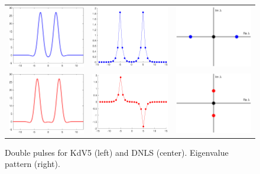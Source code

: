 \documentclass[12pt,reqno,oneside]{article}
\theoremstyle{definition}
\theoremstyle{remark}
\begin{document}
\begin{figure}
\centering
\begin{tabular}{ccc}
\includegraphics[width=4cm]{images/dp1.eps} &
\includegraphics[width=4cm]{images/dnls2unstable.eps} &
\includegraphics[width=4cm]{images/unstableeigpattern.eps} \\
\includegraphics[width=4cm]{images/dp2.eps} &
\includegraphics[width=4cm]{images/dnls2stable.eps} &
\includegraphics[width=4cm]{images/stableeigpattern.eps} 
\end{tabular}
\caption{Double pulses for KdV5 (left) and DNLS (center). Eigenvalue pattern (right).}
\label{fig:eigpatterns}
\end{figure}
\end{document}
